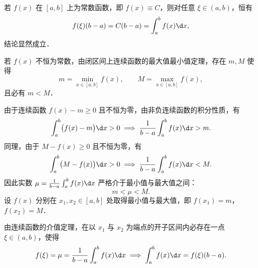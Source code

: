\begin{solution}

    若 $f(x)$ 在 $[a, b]$ 上为常数函数，即 $f(x) \equiv C$，则对任意 $\xi \in (a, b)$，恒有
    \begin{equation}
        f(\xi)(b - a) = C(b - a) = \int_a^b f(x)\d x,
    \end{equation}
    结论显然成立．

    若 $f(x)$ 不恒为常数，由闭区间上连续函数的最大值最小值定理，存在 $m, M$ 使得
    \begin{equation}
        m = \min_{x\in [a, b]} f(x), \qquad M = \max_{x\in [a, b]} f(x),
    \end{equation}
    且必有 $m < M$．

    由于连续函数 $f(x) - m \geqslant 0$ 且不恒为零，由非负连续函数的积分性质，有
    \begin{equation}
        \int_a^b \bigl( f(x) - m \bigr)\d x > 0 \implies \frac{1}{b-a}\int_a^b f(x)\d x > m.
    \end{equation}
    同理，由于 $M - f(x) \geqslant 0$ 且不恒为零，有
    \begin{equation}
        \int_a^b \bigl( M - f(x) \bigr)\d x > 0 \implies \frac{1}{b-a}\int_a^b f(x)\d x < M.
    \end{equation}
    因此实数 $\mu = \frac{1}{b-a}\int_a^b f(x)\d x$ 严格介于最小值与最大值之间：
    \begin{equation}
        m < \mu < M.
    \end{equation}
    设 $f(x)$ 分别在 $x_1, x_2 \in [a, b]$ 处取得最小值与最大值，即 $f(x_1) = m$，$f(x_2) = M$．

    由连续函数的介值定理，在以 $x_1$ 与 $x_2$ 为端点的开子区间内必存在一点 $\xi \in (a, b)$，使得
    \begin{equation}
        f(\xi) = \mu = \frac{1}{b-a}\int_a^b f(x)\d x \implies \int_a^b f(x)\d x = f(\xi)(b-a).
    \end{equation}



\end{solution}
